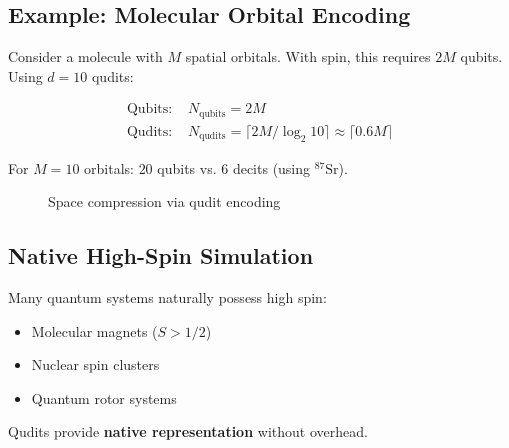\documentclass[12pt,twocolumn]{article}
\begin{document}
\subsection{Example: Molecular Orbital Encoding}
Consider a molecule with $M$ spatial orbitals. With spin, this requires $2M$ qubits. Using $d=10$ qudits:

\begin{align}
\text{Qubits: } & N_{\text{qubits}} = 2M \\
\text{Qudits: } & N_{\text{qudits}} = \lceil 2M / \log_2 10 \rceil \approx \lceil 0.6M \rceil
\end{align}

For $M=10$ orbitals: $20$ qubits vs. $6$ decits (using $^{87}\text{Sr}$).

\begin{figure}[H]
\centering
{}
\caption{Space compression via qudit encoding}
\label{fig:compression}
\end{figure}

\subsection{Native High-Spin Simulation}
Many quantum systems naturally possess high spin:
\begin{itemize}
\item Molecular magnets ($S > 1/2$)
\item Nuclear spin clusters
\item Quantum rotor systems
\end{itemize}
Qudits provide \textbf{native representation} without overhead.
\end{document}
